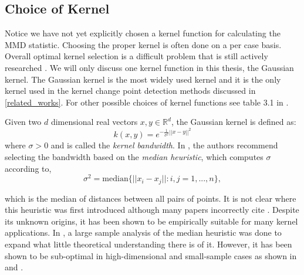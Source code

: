 \subsection{Choice of Kernel}
Notice we have not yet explicitly chosen a kernel function for calculating the MMD statistic. Choosing the proper kernel is often done on a per case basis. Overall optimal kernel selection is a difficult problem that is still actively researched \cite{gretton2012optimal}. We will only discuss one kernel function in this thesis, the Gaussian kernel. The Gaussian kernel is the most widely used kernel and it is the only kernel used in the kernel change point detection methods discussed in \ref{related_works}.  For other possible choices of kernel functions see table 3.1 in \cite{muandet2017kernel}.

Given two $d$ dimensional real vectors $x, y \in \mathbb{R}^d$, the Gaussian kernel is defined as:
\begin{equation}
k(x, y)= e^{-\frac{1}{\sigma^2}||x-y||^2}
\end{equation}
where $\sigma > 0$ and is called the \textit{kernel bandwidth}. In \cite{gretton2005kernel}, the authors recommend selecting the bandwidth based on the \textit{median heuristic}, which computes $\sigma$ according to, 
\begin{equation}
\sigma^2=\text{median}\{||x_i-x_j||:i,j = 1,...,n \},
\end{equation}

which is the median of distances between all pairs of points. It is not clear where this heuristic was first introduced although many papers incorrectly cite \cite{scholkopf2002learning}. Despite its unknown origins, it has been shown to be empirically suitable for many kernel applications. In \cite{garreau2017large}, a large sample analysis of the median heuristic was done to expand what little theoretical understanding there is of it. However, it has been shown to be sub-optimal in high-dimensional and small-sample cases as shown in \cite{muandet2014kernel} and \cite{ramdas2015decreasing}. 





